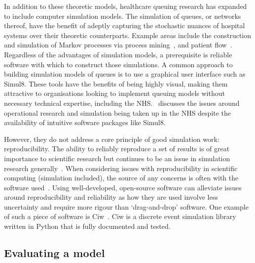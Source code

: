 In addition to these theoretic models, healthcare queuing research has expanded
to include computer simulation models. The simulation of queues, or networks
thereof, have the benefit of adeptly capturing the stochastic nuances of
hospital systems over their theoretic counterparts. Example areas include the
construction and simulation of Markov processes via process
mining~\cite{Arnolds2018,Rebuge2012}, and patient flow~\cite{Bhattacharjee2014}.
Regardless of the advantages of simulation models, a prerequisite is reliable
software with which to construct those simulations. A common approach to
building simulation models of queues is to use a graphical user interface such
as Simul8. These tools have the benefits of being highly visual, making them
attractive to organisations looking to implement queuing models without
necessary technical expertise, including the NHS.~\cite{Brailsford2013}
discusses the issues around operational research and simulation being taken up
in the NHS despite the availability of intuitive software packages like Simul8.

However, they do not address a core principle of good simulation work:
reproducibility. The ability to reliably reproduce a set of results is of great
importance to scientific research but continues to be an issue in simulation research
generally~\cite{Fitzpatrick2019,Taylor2018}. When considering issues with
reproducibility in scientific computing (simulation included), the source of any
concerns is often with the software used~\cite{Ivie2018}. Using well-developed,
open-source software can alleviate issues around reproducibility and reliability
as how they are used involve less uncertainty and require more rigour than
‘drag-and-drop’ software. One example of such a piece of software is
Ciw~\cite{Palmer2019}. Ciw is a discrete event simulation library written in
Python that is fully documented and tested.


\subsection{Evaluating a model}

